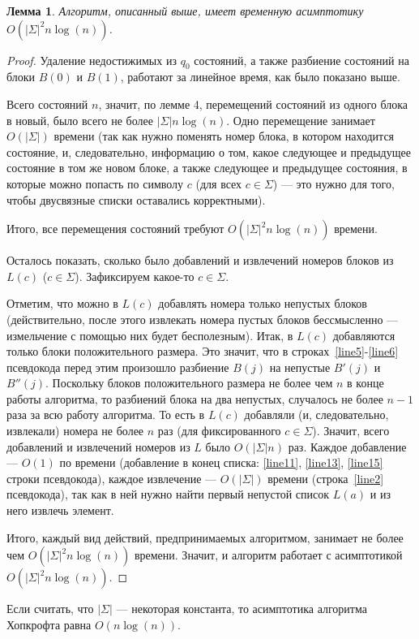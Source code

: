 \documentclass{article}
\newtheorem{lemma}{Лемма}
\begin{document}
\begin{lemma}
  \label{lemma5}
  Алгоритм, описанный выше, имеет временную асимптотику $O(|\Sigma|^2n\log(n))$.
\end{lemma}
\begin{proof}
  Удаление недостижимых из $q_0$ состояний, а также разбиение состояний на блоки $B(0)$ и $B(1)$, работают за линейное время, как было показано выше.

  Всего состояний $n$, значит, по лемме 4, перемещений состояний из одного блока в новый, было всего не более $|\Sigma| n \log(n)$. Одно перемещение занимает $O(|\Sigma|)$ времени (так как нужно поменять номер блока, в котором находится состояние, и, следовательно, информацию о том, какое следующее и предыдущее состояние в том же новом блоке, а также следующее и предыдущее состояния, в которые можно попасть по символу $c$ (для всех $c \in \Sigma$) --- это нужно для того, чтобы двусвязные списки оставались корректными).

  Итого, все перемещения состояний требуют $O(|\Sigma|^2n\log(n))$ времени.

  Осталось показать, сколько было добавлений и извлечений номеров блоков из $L(c)$ ($c \in \Sigma$). Зафиксируем какое-то $c \in \Sigma$.

  Отметим, что можно в $L(c)$ добавлять номера только непустых блоков (действительно, после этого извлекать номера пустых блоков бессмысленно --- измельчение с помощью них будет бесполезным). Итак, в $L(c)$ добавляются только блоки положительного размера. Это значит, что в строках~\ref{line5}-\ref{line6} псевдокода перед этим произошло разбиение $B(j)$ на непустые $B'(j)$ и $B''(j)$. Поскольку блоков положительного размера не более чем $n$ в конце работы алгоритма, то разбиений блока на два непустых, случалось не более $n - 1$ раза за всю работу алгоритма. То есть в $L(c)$ добавляли (и, следовательно, извлекали) номера не более $n$ раз (для фиксированного $c \in \Sigma$). Значит, всего добавлений и извлечений номеров из $L$ было $O(|\Sigma| n)$ раз. Каждое добавление --- $O(1)$ по времени (добавление в конец списка: \ref{line11}, \ref{line13}, \ref{line15} строки псевдокода), каждое извлечение --- $O(|\Sigma|)$ времени (строка~\ref{line2} псевдокода), так как в ней нужно найти первый непустой список $L(a)$ и из него извлечь элемент.

  Итого, каждый вид действий, предпринимаемых алгоритмом, занимает не более чем $O(|\Sigma|^2n\log(n))$ времени. Значит, и алгоритм работает с асимптотикой $O(|\Sigma|^2n\log(n))$.

\end{proof}
Если считать, что $|\Sigma|$ --- некоторая константа, то асимптотика алгоритма Хопкрофта равна $O(n\log(n))$.
\end{document}
